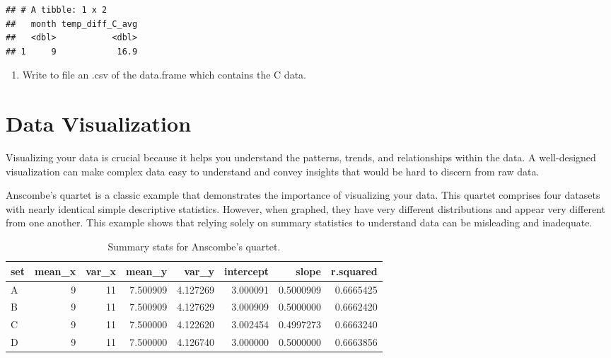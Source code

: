 \documentclass[
]{book}
\providecommand{\tightlist}{%
  \setlength{\itemsep}{0pt}\setlength{\parskip}{0pt}}
\begin{document}
\begin{verbatim}
## # A tibble: 1 x 2
##   month temp_diff_C_avg
##   <dbl>           <dbl>
## 1     9            16.9
\end{verbatim}

\begin{enumerate}
\def\labelenumi{\arabic{enumi}.}
\setcounter{enumi}{8}
\tightlist
\item
  Write to file an .csv of the data.frame which contains the C data.
\end{enumerate}

\hypertarget{data-visualization}{%
\chapter{Data Visualization}\label{data-visualization}}

Visualizing your data is crucial because it helps you understand the patterns, trends, and relationships within the data. A well-designed visualization can make complex data easy to understand and convey insights that would be hard to discern from raw data.

Anscombe's quartet is a classic example that demonstrates the importance of visualizing your data. This quartet comprises four datasets with nearly identical simple descriptive statistics. However, when graphed, they have very different distributions and appear very different from one another. This example shows that relying solely on summary statistics to understand data can be misleading and inadequate.

\begin{table}

\caption{\label{tab:unnamed-chunk-97}Summary stats for Anscombe's quartet.}
\centering
\begin{tabular}[t]{l|r|r|r|r|r|r|r}
\hline
set & mean\_x & var\_x & mean\_y & var\_y & intercept & slope & r.squared\\
\hline
A & 9 & 11 & 7.500909 & 4.127269 & 3.000091 & 0.5000909 & 0.6665425\\
\hline
B & 9 & 11 & 7.500909 & 4.127629 & 3.000909 & 0.5000000 & 0.6662420\\
\hline
C & 9 & 11 & 7.500000 & 4.122620 & 3.002454 & 0.4997273 & 0.6663240\\
\hline
D & 9 & 11 & 7.500000 & 4.126740 & 3.000000 & 0.5000000 & 0.6663856\\
\hline
\end{tabular}
\end{table}
\end{document}
